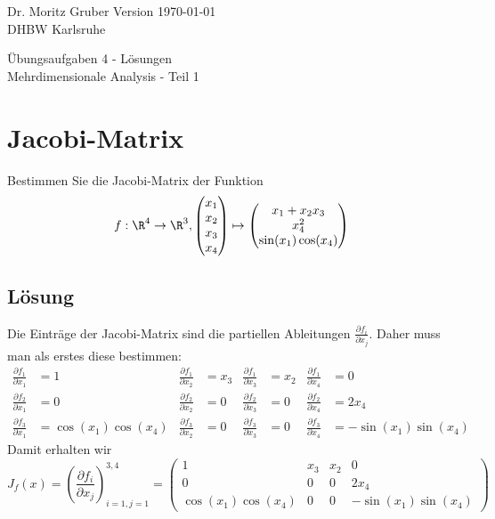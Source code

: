 




\vspace*{-20mm}
{
	\color{dhbwGray}
	Dr. Moritz Gruber	\hfill Version \today\\
	DHBW Karlsruhe\\
}

\vspace{10mm}
\begin{center}
	{
		{ \LARGE 	Übungsaufgaben 4 - Lösungen}\\[3mm]
		{\Large Mehrdimensionale Analysis - Teil 1}
	}
\end{center}

\vspace{5mm}



\section{Jacobi-Matrix}
Bestimmen Sie die Jacobi-Matrix der Funktion
$$
f: \R^4 \to \R^3, \begin{pmatrix}x_1 \\ x_2\\x_3\\x_4\end{pmatrix} \mapsto \begin{pmatrix} x_1+x_2x_3 \\ x_4^2 \\ \sin(x_1)\cos(x_4)\end{pmatrix}
$$
\subsection*{Lösung}
Die Einträge der Jacobi-Matrix sind die partiellen Ableitungen $\frac{\partial f_i}{\partial x_j}$. Daher muss man als erstes diese bestimmen:
\begin{align*}
\frac{\partial f_1}{\partial x_1} &=1  &\frac{\partial f_1}{\partial x_2}&=x_3  &\frac{\partial f_1}{\partial x_3}&=x_2  &\frac{\partial f_1}{\partial x_4}&=0  \\
\frac{\partial f_2}{\partial x_1} &=0  &\frac{\partial f_2}{\partial x_2}&=0  &\frac{\partial f_2}{\partial x_3}&=0  &\frac{\partial f_2}{\partial x_4}&= 2x_4 \\
\frac{\partial f_3}{\partial x_1} &=\cos(x_1)\cos(x_4)  &\frac{\partial f_3}{\partial x_2}&=0  &\frac{\partial f_3}{\partial x_3}&=0  &\frac{\partial f_3}{\partial x_4}&=-\sin(x_1)\sin(x_4)  
\end{align*}
Damit erhalten wir
$$
J_f(x)=\left( \frac{\partial f_i}{\partial x_j}\right)_{i=1,j=1}^{3,4} =\begin{pmatrix} 1 & x_3 & x_2 & 0 \\ 0 & 0& 0& 2x_4 \\ \cos(x_1)\cos(x_4) & 0&0& -\sin(x_1)\sin(x_4)   \end{pmatrix}
$$

